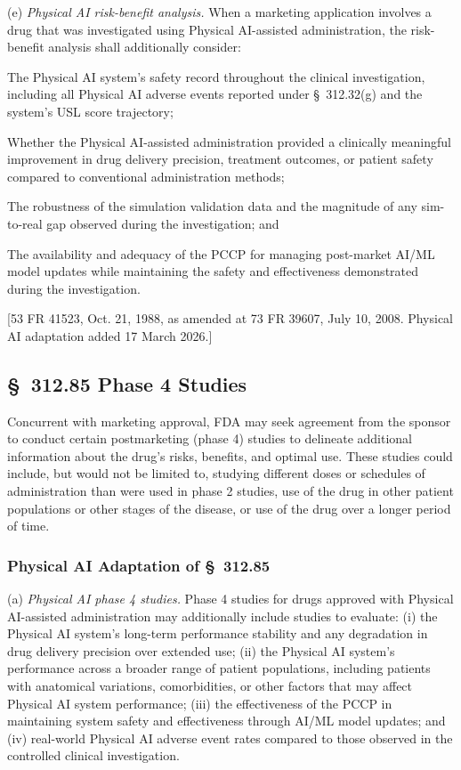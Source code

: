 \documentclass[11pt]{article}
\begin{document}
(e) \textit{Physical AI risk-benefit analysis.} When a marketing application involves a drug that was investigated using Physical AI-assisted administration, the risk-benefit analysis shall additionally consider:

\begin{description}[leftmargin=0.8cm,style=sameline]
\item[(i)] The Physical AI system's safety record throughout the clinical investigation, including all Physical AI adverse events reported under \S~312.32(g) and the system's USL score trajectory;
\item[(ii)] Whether the Physical AI-assisted administration provided a clinically meaningful improvement in drug delivery precision, treatment outcomes, or patient safety compared to conventional administration methods;
\item[(iii)] The robustness of the simulation validation data and the magnitude of any sim-to-real gap observed during the investigation; and
\item[(iv)] The availability and adequacy of the PCCP for managing post-market AI/ML model updates while maintaining the safety and effectiveness demonstrated during the investigation.
\end{description}

[53 FR 41523, Oct. 21, 1988, as amended at 73 FR 39607, July 10, 2008. Physical AI adaptation added 17 March 2026.]

\subsection{\S~312.85 Phase 4 Studies}

Concurrent with marketing approval, FDA may seek agreement from the sponsor to conduct certain postmarketing (phase 4) studies to delineate additional information about the drug's risks, benefits, and optimal use. These studies could include, but would not be limited to, studying different doses or schedules of administration than were used in phase 2 studies, use of the drug in other patient populations or other stages of the disease, or use of the drug over a longer period of time.

\subsubsection{Physical AI Adaptation of \S~312.85}

(a) \textit{Physical AI phase 4 studies.} Phase 4 studies for drugs approved with Physical AI-assisted administration may additionally include studies to evaluate: (i) the Physical AI system's long-term performance stability and any degradation in drug delivery precision over extended use; (ii) the Physical AI system's performance across a broader range of patient populations, including patients with anatomical variations, comorbidities, or other factors that may affect Physical AI system performance; (iii) the effectiveness of the PCCP in maintaining system safety and effectiveness through AI/ML model updates; and (iv) real-world Physical AI adverse event rates compared to those observed in the controlled clinical investigation.
\end{document}
